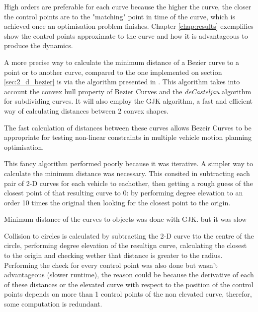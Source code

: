 \par High orders are preferable for each curve \cite{cichella2018bernstein} because the higher the curve, the closer the control points are to the "matching" point in time of the curve, which is achieved once an optimisation problem finishes. Chapter \ref{chap:results} exemplifies show the control points approximate to the curve and how it is advantageous to produce the dynamics.

\par A more precise way to calculate the minimum distance of a Bezier curve to a point or to another curve, compared to the one implemented on section \ref{sec:2_d_bezier} is via the algorithm presented in \cite{chang2011computation}. This algorithm takes into account the convex hull property of Bezier Curves and the \textit{deCasteljau} algorithm for subdividing curves. It will also employ the GJK algorithm, a fast and efficient way of calculating distances between 2 convex shapes\cite{cichella2018bernstein}.
\par The fast calculation of distances between these curves allows Bezeir Curves to be appropriate for testing non-linear constraints in multiple vehicle motion planning optimisation.

\par This fancy algorithm performed poorly because it was iterative. A simpler way to calculate the minimum distance was necessary. This consited in subtracting each pair of 2-D curves for each vehicle to eachother, then getting a rough guess of the closest point of that resulting curve to 0: by performing degree elevation to an order 10 times the original then looking for the closest point to the origin. 

\par Minimum distance of the curves to objects was done with GJK. but it was slow

\par Collision to circles is calculated by subtracting the 2-D curve tto the centre of the circle, performing degree elevation of the resultign curve, calculating the closest to the origin and checking wether that distance is greater to the radius. Performing the check for every control point was also done but wasn't advantageous (slower runtime), the reason could be because the derivative of each of these distances or the elevated curve with respect to the position of the control points depends on more than 1 control points of the non elevated curve, therefor, some computation is redundant.


